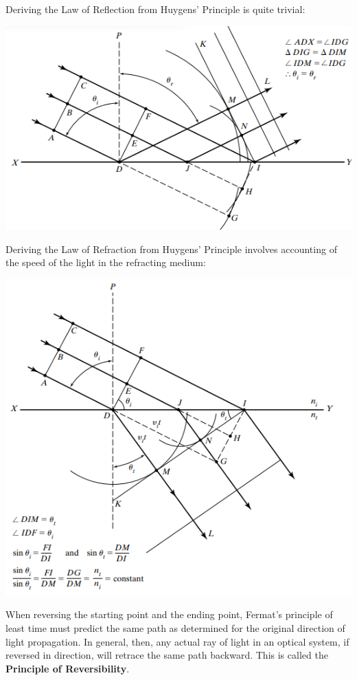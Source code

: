 \documentclass[11pt]{book}
\theoremstyle{break}
\theoremstyle{break}
\begin{document}
\newpage
Deriving the Law of Reflection from Huygens' Principle is quite trivial:
\begin{center}
\includegraphics[scale=0.8]{HuygensRefl.png}
\end{center}

Deriving the Law of Refraction from Huygens' Principle involves accounting of the speed of the light in the refracting medium:
\begin{center}
\includegraphics[scale=0.8]{HuygensRefr.png}
\end{center}

\newpage
When reversing the starting point and the ending point, Fermat's principle of least time must predict the same path as determined for the original direction of light propagation. In general, then, any actual ray of
light in an optical system, if reversed in direction, will retrace the same path backward. This is called the \textbf{Principle of Reversibility}. \\
 
\end{document}
